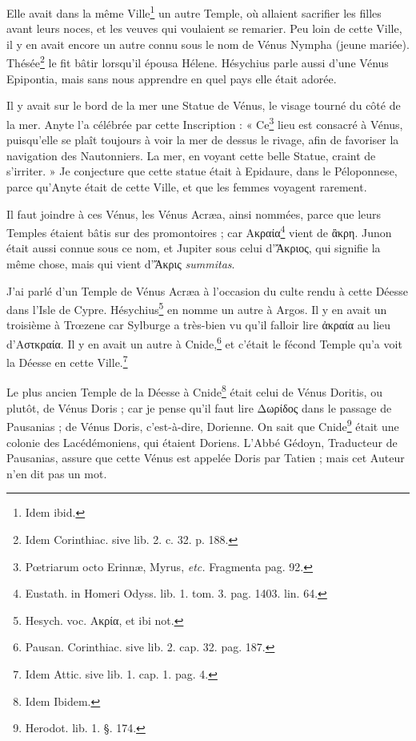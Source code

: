 \documentclass[a4paper, 11pt, oneside, polutonikogreek, french]{article}
\begin{document}
Elle avait dans la même Ville\footnote{Idem ibid.} un autre Temple, où allaient sacrifier les filles avant leurs noces, et les veuves qui voulaient se remarier. Peu loin de cette Ville, il y en avait encore un autre connu sous le nom de Vénus Nympha (jeune mariée). Thésée\footnote{Idem Corinthiac. sive lib. 2. c. 32. p. 188.} le fit bâtir lorsqu'il épousa Hélene. Hésychius parle aussi d'une Vénus Epipontia, mais sans nous apprendre en quel pays elle était adorée.

Il y avait sur le bord de la mer une Statue de Vénus, le visage tourné du côté de la mer. Anyte l'a célébrée par cette Inscription : « Ce\footnote{Pœtriarum octo Erinnæ, Myrus, \emph{etc.} Fragmenta pag. 92.} lieu est consacré à Vénus, puisqu'elle se plaît toujours à voir la mer de dessus le rivage, afin de favoriser la navigation des Nautonniers. La mer, en voyant cette belle Statue, craint de s'irriter. » Je conjecture que cette statue était à Epidaure, dans le Péloponnese, parce qu'Anyte était de cette Ville, et que les femmes voyagent rarement.

Il faut joindre à ces Vénus, les Vénus Acræa, ainsi nommées, parce que leurs Temples étaient bâtis sur des promontoires ; car Ακραία\footnote{Eustath. in Homeri Odyss. lib. 1. tom. 3. pag. 1403. lin. 64.} vient de ἂκρη. Junon était aussi connue sous ce nom, et Jupiter sous celui d'Ἄκριος, qui signifie la même chose, mais qui vient d'Ἄκρις \emph{summitas}.

J'ai parlé d'un Temple de Vénus Acræa à l'occasion du culte rendu à cette Déesse dans l'Isle de Cypre. Hésychius\footnote{Hesych. voc. Ακρία, et ibi not.} en nomme un autre à Argos. Il y en avait un troisième à Trœzene car Sylburge a très-bien vu qu'il falloir lire ἀκραία au lieu d'Αστκραία. Il y en avait un autre à Cnide,\footnote{Pausan. Corinthiac. sive lib. 2. cap. 32. pag. 187.} et c'était le fécond Temple qu'a voit la Déesse en cette Ville.\footnote{Idem Attic. sive lib. 1. cap. 1. pag. 4.}

Le plus ancien Temple de la Déesse à Cnide\footnote{Idem Ibidem.} était celui de Vénus Doritis, ou plutôt, de Vénus Doris ; car je pense qu'il faut lire Δωρίδος dans le passage de Pausanias ; de Vénus Doris, c'est-à-dire, Dorienne. On sait que Cnide\footnote{Herodot. lib. 1. §. 174.} était une colonie des Lacédémoniens, qui étaient Doriens. L'Abbé Gédoyn, Traducteur de Pausanias, assure que cette Vénus est appelée Doris par Tatien ; mais cet Auteur n'en dit pas un mot.
\end{document}
